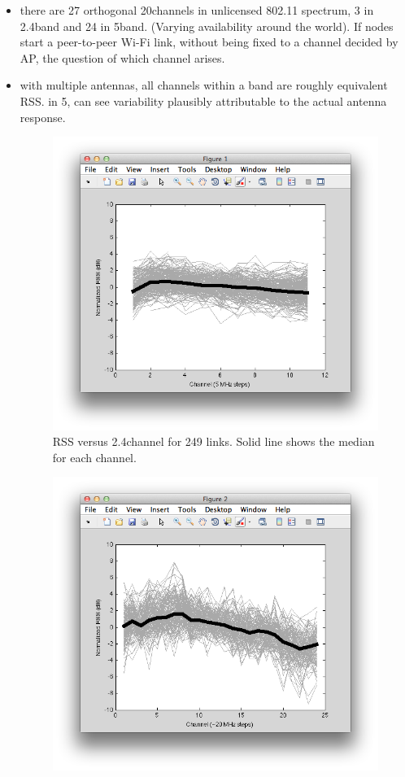 \begin{itemize}
\item there are 27 orthogonal 20\MHz channels in unlicensed 802.11 spectrum, 3 in 2.4\GHz band and 24 in 5\GHz band. (Varying availability around the world). If nodes start a peer-to-peer Wi-Fi link, without being fixed to a channel decided by AP, the question of which channel arises.
\item with multiple antennas, all channels within a band are roughly equivalent RSS. in 5\GHz, can see variability plausibly attributable to the actual antenna response.

\begin{figure}[htp]
	\centering
	\includegraphics[width=\textwidth]{figures/esnr/rssi_vs_freq_24.png}
	\caption{\label{fig:rssi_vs_freq_24}RSS versus 2.4\GHz channel for 249 links. Solid line shows the median for each channel.}
\end{figure}
\begin{figure}[htp]
	\centering
	\includegraphics[width=\textwidth]{figures/esnr/rssi_vs_freq_5.png}

\end{figure}
\end{itemize}
